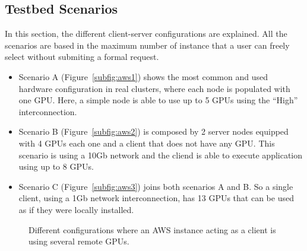 \documentclass[a4paper,twoside]{article}
\begin{document}
\subsection{Testbed Scenarios}
In this section, the different client-server configurations 
are explained. All the scenarios are based in the maximum number of instance 
that a user can freely select without submiting a formal request.

\begin{itemize}
\item Scenario A (Figure~\ref{subfig:aws1}) shows the most common 
and used hardware configuration in real clusters, where each node is 
populated with one GPU. Here, a simple node is able to use up to 5 GPUs 
using the ``High'' interconnection. 

\item Scenario B (Figure~\ref{subfig:aws2}) is composed by 2 server nodes equipped 
with 4 GPUs each one and a client that does not have any GPU. This scenario is using 
a 10Gb network and the cliend is able to execute application using up to 8 GPUs.

\item Scenario C (Figure~\ref{subfig:aws3}) joins both scenarios A and B. So a 
single client, using a 1Gb network interconnection, has 13 GPUs that can be used as if they were locally installed.
\end{itemize}

\begin{figure}[ht]
\centering
{}
\quad
{}
\caption{Different configurations where an AWS instance acting as a client is using several remote GPUs.}
\label{fig:aws}
\end{figure}
\end{document}
